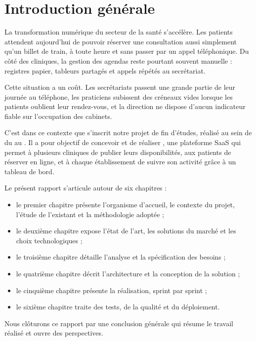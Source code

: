 \chapter*{Introduction générale}


La transformation numérique du secteur de la santé s'accélère. Les patients attendent aujourd'hui de pouvoir réserver une consultation aussi simplement qu'un billet de train, à toute heure et sans passer par un appel téléphonique. Du côté des cliniques, la gestion des agendas reste pourtant souvent manuelle : registres papier, tableurs partagés et appels répétés au secrétariat.

Cette situation a un coût. Les secrétariats passent une grande partie de leur journée au téléphone, les praticiens subissent des créneaux vides lorsque les patients oublient leur rendez-vous, et la direction ne dispose d'aucun indicateur fiable sur l'occupation des cabinets.

C'est dans ce contexte que s'inscrit notre projet de fin d'études, réalisé au sein de \entreprise{} du \datedebut{} au \datefin. Il a pour objectif de concevoir et de réaliser \nomprojet, une plateforme SaaS qui permet à plusieurs cliniques de publier leurs disponibilités, aux patients de réserver en ligne, et à chaque établissement de suivre son activité grâce à un tableau de bord.

Le présent rapport s'articule autour de six chapitres :
\begin{itemize}
  \item le premier chapitre présente l'organisme d'accueil, le contexte du projet, l'étude de l'existant et la méthodologie adoptée ;
  \item le deuxième chapitre expose l'état de l'art, les solutions du marché et les choix technologiques ;
  \item le troisième chapitre détaille l'analyse et la spécification des besoins ;
  \item le quatrième chapitre décrit l'architecture et la conception de la solution ;
  \item le cinquième chapitre présente la réalisation, sprint par sprint ;
  \item le sixième chapitre traite des tests, de la qualité et du déploiement.
\end{itemize}
Nous clôturons ce rapport par une conclusion générale qui résume le travail réalisé et ouvre des perspectives.
